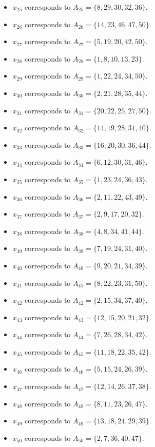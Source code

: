 \documentclass[11pt]{article}
\begin{document}
\begin{itemize}
\item $x_{25}$ corresponds to $A_{25}=\{8, 29, 30, 32, 36\}$.
\item $x_{26}$ corresponds to $A_{26}=\{14, 23, 46, 47, 50\}$.
\item $x_{27}$ corresponds to $A_{27}=\{5, 19, 20, 42, 50\}$.
\item $x_{28}$ corresponds to $A_{28}=\{1, 8, 10, 13, 23\}$.
\item $x_{29}$ corresponds to $A_{29}=\{1, 22, 24, 34, 50\}$.
\item $x_{30}$ corresponds to $A_{30}=\{2, 21, 28, 35, 44\}$.
\item $x_{31}$ corresponds to $A_{31}=\{20, 22, 25, 27, 50\}$.
\item $x_{32}$ corresponds to $A_{32}=\{14, 19, 28, 31, 40\}$.
\item $x_{33}$ corresponds to $A_{33}=\{16, 20, 30, 36, 44\}$.
\item $x_{34}$ corresponds to $A_{34}=\{6, 12, 30, 31, 46\}$.
\item $x_{35}$ corresponds to $A_{35}=\{1, 23, 24, 36, 43\}$.
\item $x_{36}$ corresponds to $A_{36}=\{2, 11, 22, 43, 49\}$.
\item $x_{37}$ corresponds to $A_{37}=\{2, 9, 17, 20, 32\}$.
\item $x_{38}$ corresponds to $A_{38}=\{4, 8, 34, 41, 44\}$.
\item $x_{39}$ corresponds to $A_{39}=\{7, 19, 24, 31, 40\}$.
\item $x_{40}$ corresponds to $A_{40}=\{9, 20, 21, 34, 39\}$.
\item $x_{41}$ corresponds to $A_{41}=\{8, 22, 23, 31, 50\}$.
\item $x_{42}$ corresponds to $A_{42}=\{2, 15, 34, 37, 40\}$.
\item $x_{43}$ corresponds to $A_{43}=\{12, 15, 20, 21, 32\}$.
\item $x_{44}$ corresponds to $A_{44}=\{7, 26, 28, 34, 42\}$.
\item $x_{45}$ corresponds to $A_{45}=\{11, 18, 22, 35, 42\}$.
\item $x_{46}$ corresponds to $A_{46}=\{5, 15, 24, 26, 39\}$.
\item $x_{47}$ corresponds to $A_{47}=\{12, 14, 26, 37, 38\}$.
\item $x_{48}$ corresponds to $A_{48}=\{8, 11, 23, 26, 47\}$.
\item $x_{49}$ corresponds to $A_{49}=\{13, 18, 24, 29, 39\}$.
\item $x_{50}$ corresponds to $A_{50}=\{2, 7, 36, 40, 47\}$.

\end{itemize}
\end{document}
